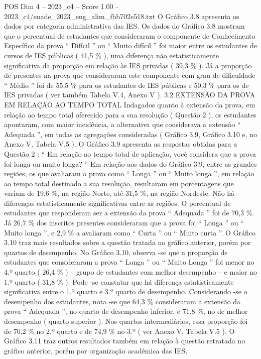\begin{textsample}{POS Dim 4 – 2023\_c4 – Score 1.00 – 2023\_c4/enade\_2023\_eng\_alim\_fbb702e518.txt}
O Gráfico 3.8 apresenta os dados por categoria administrativa das IES.
Os dados do Gráfico 3.8 mostram que o percentual de estudantes que consideraram o componente de Conhecimento Específico da prova “ Difícil ” ou “ Muito difícil ” foi maior entre os estudantes de cursos de IES públicas ( 41,5 \% ), uma diferença não estatisticamente significativa da proporção em relação às IES privadas ( 39,3 \% ).
Já a proporção de presentes na prova que consideraram este componente com grau de dificuldade “ Médio ” foi de 55,5 \% para os estudantes de IES públicas e 50,3 \% para os de IES privadas ( ver também Tabela V.4, Anexo V ). 3.2 EXTENSÃO DA PROVA EM RELAÇÃO AO TEMPO TOTAL Indagados quanto à extensão da prova, em relação ao tempo total oferecido para a sua resolução ( Questão 2 ), os estudantes apontaram, com maior incidência, a alternativa que considerava a extensão “ Adequada ”, em todas as agregações consideradas ( Gráfico 3.9, Gráfico 3.10 e, no Anexo V, Tabela V.5 ).
O Gráfico 3.9 apresenta as respostas obtidas para a Questão 2 : “ Em relação ao tempo total de aplicação, você considera que a prova foi longa ou muito longa? ” Em relação aos dados do Gráfico 3.9, entre as grandes regiões, os que avaliaram a prova como “ Longa ” ou “ Muito longa ”, em relação ao tempo total destinado a sua resolução, resultaram em porcentagens que variam de 19,6 \%, na região Norte, até 31,5 \%, na região Nordeste.
Não há diferenças estatisticamente significativas entre as regiões.
O percentual de estudantes que responderam ser a extensão da prova “ Adequada ” foi de 70,3 \%.
Já 26,7 \% dos inscritos presentes consideraram que a prova foi “ Longa ” ou “ Muito longa ”, e 2,9 \% a avaliaram como “ Curta ” ou “ Muito curta ”.
O Gráfico 3.10 traz mais resultados sobre a questão tratada no gráfico anterior, porém por quartos de desempenho.
No Gráfico 3.10, observa -se que a proporção de estudantes que consideraram a prova “ Longa ” ou “ Muito Longa ” foi menor no 4.º quarto ( 26,4 \% ) – grupo de estudantes com melhor desempenho – e maior no 1.º quarto ( 31,8 \% ).
Pode -se constatar que há diferença estatisticamente significativa entre o 1.º quarto e 3.º quarto de desempenho.
Considerando -se o desempenho dos estudantes, nota -se que 64,3 \% consideraram a extensão da prova “ Adequada ”, no quarto de desempenho inferior, e 71,8 \%, no de melhor desempenho ( quarto superior ).
Nos quartos intermediários, essa proporção foi de 70,2 \% no 2.º quarto e de 74,9 \% no 3.º ( ver Anexo V, Tabela V.5 ).
O Gráfico 3.11 traz outros resultados também em relação à questão retratada no gráfico anterior, porém por organização acadêmica das IES.

\end{textsample}
